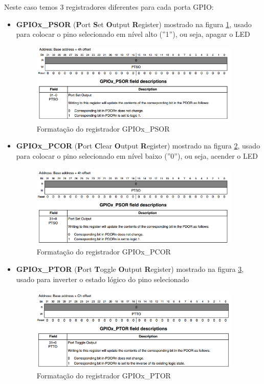 \documentclass{article}
\begin{document}
Neste caso temos 3 registradores diferentes para cada porta GPIO:
\begin{itemize}
\item \textbf{GPIOx\_PSOR} (\textbf{P}ort \textbf{S}et \textbf{O}utput \textbf{R}egister) mostrado na figura \ref{psor}, usado para colocar o pino selecionado em nível alto (''1''), ou seja, apagar o LED
  \begin{figure}[ht!]
    \centering
    \includegraphics[width=100mm]{psor.png}
    \caption{Formatação do registrador GPIOx\_PSOR \label{psor}}
  \end{figure}

\item \textbf{GPIOx\_PCOR} (\textbf{P}ort \textbf{C}lear \textbf{O}utput \textbf{R}egister) mostrado na figura \ref{pcor}, usado para colocar o pino selecionado em nível baixo (''0''), ou seja, acender o LED
  \begin{figure}[ht!]
    \centering
    \includegraphics[width=100mm]{pcor.png}
    \caption{Formatação do registrador GPIOx\_PCOR \label{pcor}}
  \end{figure}

\item \textbf{GPIOx\_PTOR} (\textbf{P}ort \textbf{T}oggle \textbf{O}utput \textbf{R}egister) mostrado na figura \ref{ptor}, usado para inverter o estado lógico do pino selecionado
  \begin{figure}[ht!]
    \centering
    \includegraphics[width=100mm]{ptor.png}
    \caption{Formatação do registrador GPIOx\_PTOR \label{ptor}}
  \end{figure}
\end{itemize}
\end{document}
